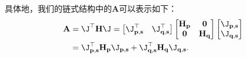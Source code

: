 具体地，我们的链式结构中的$\mathbf{A}$可以表示如下：
\begin{equation}
  \begin{aligned}
    \mathbf{A} & = \J^{\top} \mathbf{H} \J =
    \begin{bmatrix}
      \J_{\mathbf{p, s}}^{\top} &
      \J_{\mathbf{q, s}}^{\top}
    \end{bmatrix}
    \begin{bmatrix}
      \mathbf{H}_{\mathbf{p}} & \mathbf{0}              \\
      \mathbf{0}              & \mathbf{H}_{\mathbf{q}}
    \end{bmatrix}
    \begin{bmatrix}
      \J_{\mathbf{p, s}} \\
      \J_{\mathbf{q, s}}
    \end{bmatrix}                                                          \\
               & =\J^{\top}_{\mathbf{p, s}} \mathbf{H}_{\mathbf{p}} \J_{\mathbf{p, s}} +
    \J^{\top}_{\mathbf{q, s}} \mathbf{H}_{\mathbf{q}} \J_{\mathbf{q, s}}.
  \end{aligned}
  \label{eq:A}
\end{equation}
